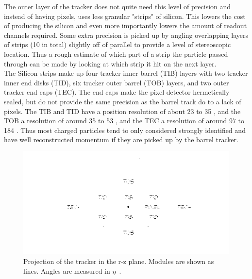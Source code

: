 	The outer layer of the tracker does not quite need this level of precision and instead of having pixels, uses less granular "strips" of silicon. This lowers the cost of producing the silicon and even more importantly lowers the amount of readout channels required. Some extra precision is picked up by angling overlapping layers of strips (10 in total) slightly off of parallel to provide a level of stereoscopic location. Thus a rough estimate of which part of a strip the particle passed through can be made by looking at which strip it hit on the next layer.\\
	
	The Silicon strips make up four tracker inner barrel (TIB) layers with two tracker inner end disks (TID), six tracker outer barrel (TOB) layers, and two outer tracker end caps (TEC). The end caps make the pixel detector hermetically sealed, but do not provide the same precision as the barrel track do to a lack of pixels. The TIB and TID have a position resolution of about 23 to 35 \um, and the TOB a resolution of around 35 to 53 \um, and the TEC a resolution of around 97 to 184 \um. Thus most charged particles tend to only considered strongly identified and have well reconstructed momentum if they are picked up by the barrel tracker.\\
	
						\begin{figure}[h]
\begin{center}
\includegraphics[width=0.9\linewidth]{Figs/tracker_layout.png}
\caption{\label{fig:tracker}
Projection of the tracker in the r-z plane. Modules are shown as lines. Angles are measured in $\eta$~\cite{trackingperformance}.
}
\end{center}
\end{figure}
	

